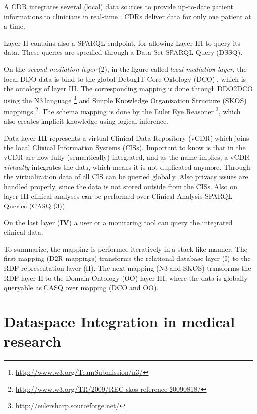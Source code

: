 A CDR integrates several (local) data sources to provide up-to-date patient informations to clinicians in real-time \cite[p. 82]{carter2008electronic}. CDRs deliver data for only one patient at a time.

Layer II contains also a SPARQL endpoint, for allowing Layer III to query its data. These queries are specified through a Data Set SPARQL Query (DSSQ). 

On the \emph{second mediation layer} (2), in the figure called \emph{local mediation layer}, the local DDO data is bind to the global DebugIT Core Ontology (DCO) \cite{Schober_developingdco:}, which is the ontology of layer III. The corresponding mapping is done through DDO2DCO using the N3 language \footnote{\url{http://www.w3.org/TeamSubmission/n3/}} and Simple Knowledge Organization Structure (SKOS) mappings \footnote{\url{http://www.w3.org/TR/2009/REC-skos-reference-20090818/}}. The schema mapping is done by the Euler Eye Reasoner \footnote{\url{http://eulersharp.sourceforge.net/}}, which also creates implicit knowledge using logical inference.

Data layer \textbf{III} represents a virtual Clinical Data Repository (vCDR) which joins the local Clinical Information Systems (CISs). Important to know is that in the vCDR are now fully (semantically) integrated, and as the name implies, a vCDR \emph{virtually} integrates the data, which means it is not duplicated anymore. Through the virtualization data of all CIS can be queried globally. Also privacy issues are handled properly, since the data is not stored outside from the CISs.
Also on layer III clinical analyses can be performed over Clinical Analysis SPARQL Queries (CASQ (3)). 

On the last layer (\textbf{IV}) a user or a monitoring tool can query the integrated clinical data.

To summarize, the mapping is performed iteratively in a stack-like manner:
The first mapping \textalpha (D2R mappings) transforms the relational database layer (I) to the RDF representation layer (II). The next mapping \textbeta (N3 and SKOS) transforms the RDF layer II to the Domain Ontology (OO) layer III, where the data is globally queryable as CASQ over mapping \textgamma (DCO and OO).  

\section{Dataspace Integration in medical research}

